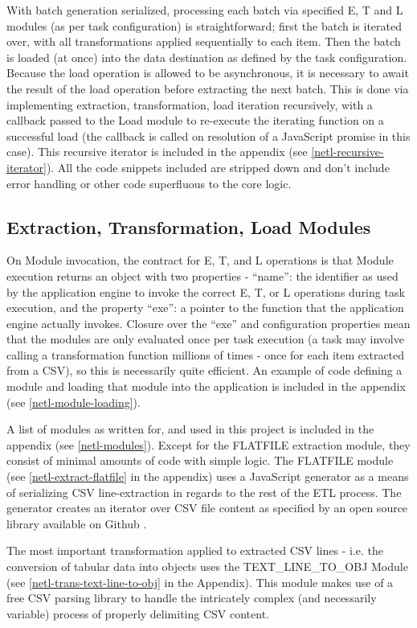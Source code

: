 With batch generation serialized, processing each batch via specified E, T and L modules (as per task configuration) is straightforward; first the batch is iterated over, with all transformations applied sequentially to each item. Then the batch is loaded (at once) into the data destination as defined by the task configuration. Because the load operation is allowed to be asynchronous, it is necessary to await the result of the load operation before extracting the next batch. This is done via implementing extraction, transformation, load iteration recursively, with a callback passed to the Load module to re-execute the iterating function on a successful load (the callback is called on resolution of a JavaScript promise in this case). This recursive iterator is included in the appendix (see \ref{netl-recursive-iterator}). All the code snippets included are stripped down and don't include error handling or other code superfluous to the core logic.

\subsection{Extraction, Transformation, Load Modules}
On Module invocation, the contract for E, T, and L operations is that Module execution returns an object with two properties - ``name'': the identifier as used by the application engine to invoke the correct E, T, or L operations during task execution, and the property ``exe'': a pointer to the function that the application engine actually invokes. Closure over the ``exe'' and configuration properties mean that the modules are only evaluated once per task execution (a task may involve calling a transformation function millions of times - once for each item extracted from a CSV), so this is necessarily quite efficient. An example of code defining a module and loading that module into the application is included in the appendix (see \ref{netl-module-loading}).

A list of modules as written for, and used in this project is included in the appendix (see \ref{netl-modules}). Except for the FLATFILE extraction module, they consist of minimal amounts of code with simple logic. The FLATFILE module (see \ref{netl-extract-flatfile} in the appendix) uses a JavaScript generator as a means of serializing CSV line-extraction in regards to the rest of the ETL process. The generator creates an iterator over CSV file content as specified by an open source library available on Github \cite{bower16}.

The most important transformation applied to extracted CSV lines - i.e. the conversion of tabular data into objects uses the TEXT\_LINE\_TO\_OBJ Module (see \ref{netl-trans-text-line-to-obj} in the Appendix). This module makes use of a free CSV parsing library \cite{csvParse} to handle the intricately complex (and necessarily variable) process of properly delimiting CSV content.

